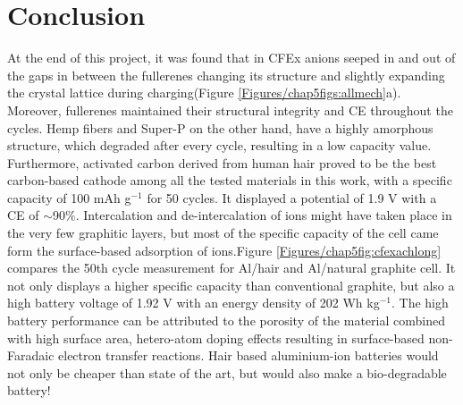 \newpage
\section*{Conclusion}
At the end of this project, it was found that in CFEx  anions seeped in and out of the gaps in between the fullerenes changing its structure and slightly expanding the crystal lattice during charging(Figure \ref{Figures/chap5figs:allmech}a). Moreover, fullerenes maintained their structural integrity and CE throughout the cycles. Hemp fibers and Super-P on the other hand, have a highly amorphous structure, which degraded after every cycle, resulting in a low capacity value. Furthermore, activated carbon derived from human hair proved to be the best carbon-based cathode among all the tested materials in this work, with a specific capacity of 100 mAh g$^{-1}$ for 50 cycles. It displayed a potential of 1.9 V with a CE of $\sim$90$\%$. Intercalation and de-intercalation of  ions might have taken place in the very few graphitic layers, but most of the specific capacity of the cell came form the surface-based adsorption of ions.Figure \ref{Figures/chap5fig:cfexachlong} compares the 50th cycle measurement for Al/hair and Al/natural graphite cell. It not only displays a higher specific capacity than conventional graphite, but also a high battery voltage of 1.92 V with an energy density of 202 Wh kg$^{-1}$. The high battery performance can be attributed to the porosity of the material combined with high surface area, hetero-atom doping effects resulting in surface-based non-Faradaic electron transfer reactions. Hair based aluminium-ion batteries would not only be cheaper than state of the art, but would also make a bio-degradable battery!